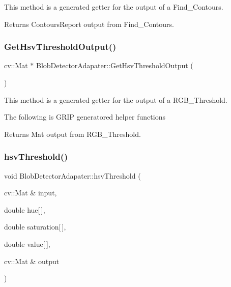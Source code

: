 This method is a generated getter for the output of a Find\+\_\+\+Contours. 

\begin{DoxyReturn}{Returns}
Contours\+Report output from Find\+\_\+\+Contours. 
\end{DoxyReturn}
\mbox{\label{classBlobDetectorAdapater_ae6cd1a0e7c6fdb0cdacdeba7bf472398}} 
\subsubsection{\texorpdfstring{Get\+Hsv\+Threshold\+Output()}{GetHsvThresholdOutput()}}
{\footnotesize\ttfamily cv\+::\+Mat $\ast$ Blob\+Detector\+Adapater\+::\+Get\+Hsv\+Threshold\+Output (\begin{DoxyParamCaption}{ }\end{DoxyParamCaption})}



This method is a generated getter for the output of a R\+G\+B\+\_\+\+Threshold. 

The following is G\+R\+IP generatored helper functions \begin{DoxyReturn}{Returns}
Mat output from R\+G\+B\+\_\+\+Threshold. 
\end{DoxyReturn}
\mbox{\label{classBlobDetectorAdapater_ad6089c689fcfb884fc32ca4e3676f6ec}} 
\subsubsection{\texorpdfstring{hsv\+Threshold()}{hsvThreshold()}}
{\footnotesize\ttfamily void Blob\+Detector\+Adapater\+::hsv\+Threshold (\begin{DoxyParamCaption}\item[{cv\+::\+Mat \&}]{input,  }\item[{double}]{hue\mbox{[}$\,$\mbox{]},  }\item[{double}]{saturation\mbox{[}$\,$\mbox{]},  }\item[{double}]{value\mbox{[}$\,$\mbox{]},  }\item[{cv\+::\+Mat \&}]{output }\end{DoxyParamCaption})\hspace{0.3cm}{\ttfamily [private]}}



